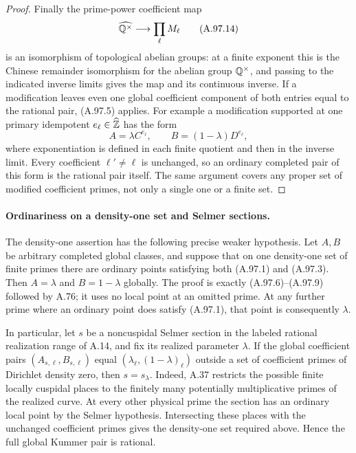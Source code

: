 \begin{proof}
Finally the prime-power coefficient map
\[
             \widehat{\mathbb Q^\times}
                         \longrightarrow\prod_\ell M_\ell
\tag{A.97.14}
\]
is an isomorphism of topological abelian groups:
at a finite exponent this is the Chinese remainder
isomorphism for the abelian group $\mathbb Q^\times$, and
passing to the indicated inverse limits gives the map
and its continuous inverse.  If a modification leaves
even one global coefficient component of both entries
equal to the rational pair, (A.97.5) applies.
For example a modification supported at one primary
idempotent $e_\ell\in\widehat{\mathbb Z}$ has the form
\[
              A=\lambda C^{e_\ell},\qquad
              B=(1-\lambda)D^{e_\ell},
\tag{A.97.15}
\]
where exponentiation is defined in each finite quotient
and then in the inverse limit.  Every coefficient
$\ell'\ne\ell$ is unchanged, so an ordinary completed
pair of this form is the rational pair itself.
The same argument covers any proper set of modified
coefficient primes, not only a single one or a finite set.
\end{proof}

\paragraph{Ordinariness on a density-one set and Selmer sections.}
The density-one assertion has the following precise weaker
hypothesis.  Let $A,B$ be arbitrary completed global classes,
and suppose that on one density-one set of finite primes
there are ordinary points satisfying both (A.97.1) and
(A.97.3).  Then $A=\lambda$ and $B=1-\lambda$ globally.
The proof is exactly (A.97.6)--(A.97.9) followed by A.76;
it uses no local point at an omitted prime.  At any further
prime where an ordinary point does satisfy (A.97.1), that
point is consequently $\lambda$.

In particular, let $s$ be a noncuspidal Selmer section in
the labeled rational realization range of A.14, and fix
its realized parameter $\lambda$.
If the global coefficient pairs
$(A_{s,\ell},B_{s,\ell})$ equal
$(\lambda_\ell,(1-\lambda)_\ell)$ outside a set of
coefficient primes of Dirichlet density zero, then
$s=s_\lambda$.
Indeed, A.37 restricts the possible finite locally
cuspidal places to the finitely many potentially
multiplicative primes of the realized curve.
At every other physical prime the section has an ordinary
local point by the Selmer hypothesis.
Intersecting these places with the unchanged coefficient
primes gives the density-one set required above.
Hence the full global Kummer pair is rational.

